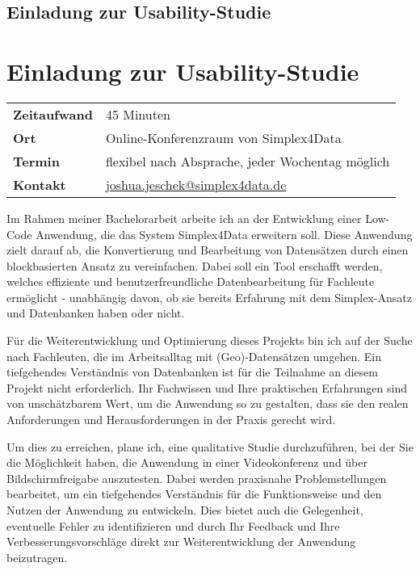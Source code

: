 \ifdefined\STANDALONE
  \section*{Einladung zur Usability-Studie}
\else
  \chapter{Einladung zur Usability-Studie}
\fi

\begin{tabular}{ l l }
  \textbf{Zeitaufwand} & 45 Minuten                                                                   \\
  \textbf{Ort}         & Online-Konferenzraum von Simplex4Data                                        \\
  \textbf{Termin}      & flexibel nach Absprache, jeder Wochentag möglich                             \\
  \textbf{Kontakt}     & \href{mailto:joshua.jeschek@simplex4data.de}{joshua.jeschek@simplex4data.de}
\end{tabular}

\vspace{2\baselineskip}

\noindent
Im Rahmen meiner Bachelorarbeit arbeite ich an der Entwicklung einer Low-Code Anwendung, die das
System Simplex4Data erweitern soll. Diese Anwendung zielt darauf ab, die Konvertierung und
Bearbeitung von Datensätzen durch einen blockbasierten Ansatz zu vereinfachen. Dabei soll ein
Tool erschafft werden, welches effiziente und benutzerfreundliche Datenbearbeitung für Fachleute
ermöglicht - unabhängig davon, ob sie bereits Erfahrung mit dem Simplex-Ansatz und Datenbanken haben
oder nicht.

Für die Weiterentwicklung und Optimierung dieses Projekts bin ich auf der Suche nach Fachleuten,
die im Arbeitsalltag mit (Geo)-Datensätzen umgehen. Ein tiefgehendes Verständnis von Datenbanken ist
für die Teilnahme an diesem Projekt nicht erforderlich. Ihr Fachwissen und Ihre praktischen
Erfahrungen sind von unschätzbarem Wert, um die Anwendung so zu gestalten, dass sie den realen
Anforderungen und Herausforderungen in der Praxis gerecht wird.

Um dies zu erreichen, plane ich, eine qualitative Studie durchzuführen, bei der Sie die Möglichkeit
haben, die Anwendung in einer Videokonferenz und über Bildschirmfreigabe auszutesten. Dabei
werden praxisnahe Problemstellungen bearbeitet, um ein tiefgehendes Verständnis für die
Funktionsweise und den Nutzen der Anwendung zu entwickeln. Dies bietet auch die Gelegenheit,
eventuelle Fehler zu identifizieren und durch Ihr Feedback und Ihre Verbesserungsvorschläge
direkt zur Weiterentwicklung der Anwendung beizutragen.

